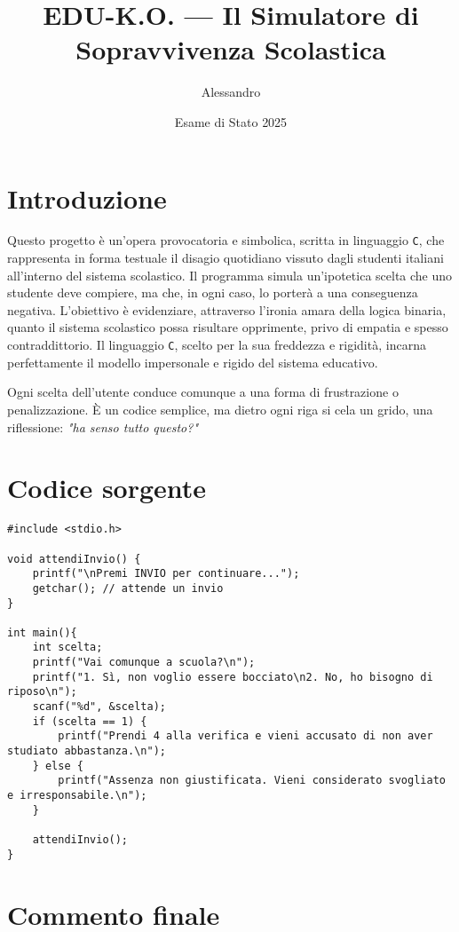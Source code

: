 \documentclass[12pt]{article}
\title{\textbf{EDU-K.O. --- Il Simulatore di Sopravvivenza Scolastica}}
\author{Alessandro}
\date{Esame di Stato 2025}
\begin{document}
\maketitle

\section*{Introduzione}

\noindent
Questo progetto è un'opera provocatoria e simbolica, scritta in linguaggio \texttt{C}, che rappresenta in forma testuale il disagio quotidiano vissuto dagli studenti italiani all'interno del sistema scolastico. Il programma simula un'ipotetica scelta che uno studente deve compiere, ma che, in ogni caso, lo porterà a una conseguenza negativa. L'obiettivo è evidenziare, attraverso l'ironia amara della logica binaria, quanto il sistema scolastico possa risultare opprimente, privo di empatia e spesso contraddittorio. Il linguaggio \texttt{C}, scelto per la sua freddezza e rigidità, incarna perfettamente il modello impersonale e rigido del sistema educativo.

\vspace{1em}
\noindent
Ogni scelta dell’utente conduce comunque a una forma di frustrazione o penalizzazione. È un codice semplice, ma dietro ogni riga si cela un grido, una riflessione: \emph{"ha senso tutto questo?"}

\section*{Codice sorgente}

\begin{lstlisting}
#include <stdio.h>

void attendiInvio() {
    printf("\nPremi INVIO per continuare...");
    getchar(); // attende un invio
}

int main(){
    int scelta;
    printf("Vai comunque a scuola?\n");
    printf("1. Sì, non voglio essere bocciato\n2. No, ho bisogno di riposo\n");
    scanf("%d", &scelta);
    if (scelta == 1) {
        printf("Prendi 4 alla verifica e vieni accusato di non aver studiato abbastanza.\n");
    } else {
        printf("Assenza non giustificata. Vieni considerato svogliato e irresponsabile.\n");
    }

    attendiInvio();
}
\end{lstlisting}

\section*{Commento finale}
\end{document}
